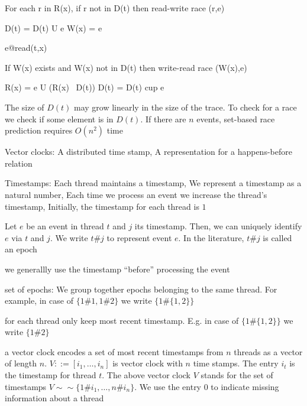 \documentclass[landscape, a4paper]{article}
\begin{document}
\begin{minipage}[t]{0.2\linewidth}
\begin{betterlist}
\begin{betterlist}
\begin{betterlist}
\begin{betterlist}
{\begin{dnumberedcodebox}[minted language=text,minted options={autogobble, fontsize=\small}, box align=top]
{                    For each r in R(x),
                    if r not in D(t)
                    then read-write race  (r,e)

                    D(t) = D(t) U { e }
                    W(x) = e
                  }
                  e@read(t,x) {
                    If W(x) exists and W(x) not in D(t)
                    then write-read race (W(x),e)

                    R(x) = {e} U (R(x) \ D(t))
                    D(t) = D(t) cup { e }
                  }
                  \end{dnumberedcodebox}
					}
					\item The size of $D(t)$ may grow linearly in the size of the trace. To check for a race we check if some element is in $D(t)$. If there are $n$ events, set-based race prediction requires $O(n^2)$ time
				\end{betterlist}
			\end{betterlist}
			\item \alert{Vector clocks}: A distributed time stamp, A representation for a happens-before relation
			\begin{betterlist}
				\item \alert{Timestamps:} Each thread maintains a timestamp, We represent a timestamp as a natural number, Each time we process an event we increase the thread’s timestamp, Initially, the timestamp for each thread is $1$
				\begin{betterlist}
					\item Let $e$ be an event in thread $t$ and $j$ its timestamp. Then, we can uniquely identify $e$ via $t$ and $j$. We write $t\#j$ to represent event $e$. In the literature, $t\#j$ is called an \alert{epoch}
					\begin{betterlist}
						\item we generallly use the timestamp \enquote{before} processing the event
					\end{betterlist}
					\item \alert{set of epochs:} We group together epochs belonging to the same thread. For example, in case of $\{1\#1, 1\#2\}$ we write $\{1\#\{1, 2\}\}$
				\end{betterlist}
				\item for each thread only keep most recent timestamp. E.g. in case of $\{1\#\{1, 2\}\}$ we write $\{1\#2\}$
				\item a \alert{vector clock} encodes a set of most recent timestamps from $n$ threads as a vector of length $n$. $V ::= [i_1,\ldots ,i_n]$ is vector clock with $n$ time stamps. The entry $i_t$ is the timestamp for thread $t$. The above vector clock $V$ stands for the set of timestamps $V  \sim\sim  \{1\#i_1, \ldots, n\#i_n\}$. We use the entry $0$ to indicate missing information about a thread

\end{betterlist}
\end{betterlist}
\end{betterlist}
\end{minipage}
\end{document}
